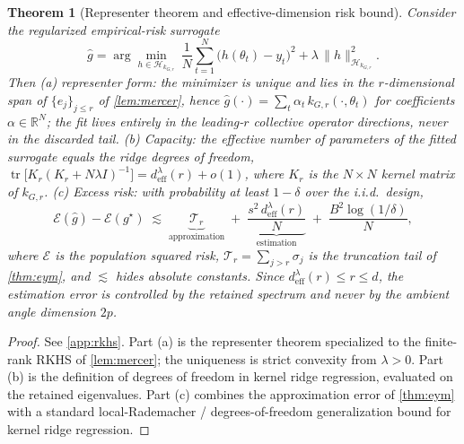 \documentclass[aps,prxquantum,reprint,amsmath,amssymb,floatfix,nofootinbib,superscriptaddress,longbibliography]{revtex4-2}
\newtheorem{theorem}{Theorem}
\theoremstyle{remark}
\newcommand{\bbR}{\mathbb{R}}
\begin{document}
\begin{theorem}[Representer theorem and effective-dimension risk bound]
\label{thm:rkhs}
Consider the regularized empirical-risk surrogate
\begin{equation}
    \widehat g = \arg\min_{h\in\mathcal H_{k_{G,r}}}
    \ \frac1N\sum_{t=1}^{N}\bigl(h(\theta_t)-y_t\bigr)^2
    +\lambda\,\|h\|_{\mathcal H_{k_{G,r}}}^2 .
    \label{eq:erm}
\end{equation}
Then \emph{(a) representer form:} the minimizer is unique and lies in the
\(r\)-dimensional span of \(\{e_j\}_{j\le r}\) of \cref{lem:mercer}, hence
\(\widehat g(\cdot)=\sum_{t}\alpha_t\,k_{G,r}(\cdot,\theta_t)\) for coefficients
\(\alpha\in\bbR^{N}\); the fit lives entirely in the leading-\(r\) collective
operator directions, never in the discarded tail. \emph{(b) Capacity:} the
effective number of parameters of the fitted surrogate equals the ridge degrees of
freedom, \(\operatorname{tr}\!\bigl[K_{r}(K_{r}+N\lambda I)^{-1}\bigr]
= d_{\mathrm{eff}}^{\lambda}(r)+o(1)\), where \(K_r\) is the \(N\times N\) kernel
matrix of \(k_{G,r}\). \emph{(c) Excess risk:} with probability at least
\(1-\delta\) over the i.i.d.\ design,
\begin{equation}
    \mathcal E(\widehat g)-\mathcal E(g^{\star})
    \;\lesssim\;
    \underbrace{\mathcal T_r}_{\text{approximation}}
    \;+\;
    \underbrace{\frac{s^2\,d_{\mathrm{eff}}^{\lambda}(r)}{N}}_{\text{estimation}}
    \;+\;\frac{B^2\log(1/\delta)}{N},
    \label{eq:excessrisk}
\end{equation}
where \(\mathcal E\) is the population squared risk, \(\mathcal T_r=\sum_{j>r}
\sigma_j\) is the truncation tail of \cref{thm:eym}, and \(\lesssim\) hides
absolute constants. Since \(d_{\mathrm{eff}}^{\lambda}(r)\le r\le d\), the
estimation error is controlled by the retained spectrum and never by the ambient
angle dimension \(2p\).
\end{theorem}

\begin{proof}
See \cref{app:rkhs}. Part (a) is the representer theorem specialized to the
finite-rank RKHS of \cref{lem:mercer}; the uniqueness is strict convexity from
\(\lambda>0\). Part (b) is the definition of degrees of freedom in kernel ridge
regression, evaluated on the retained eigenvalues. Part (c) combines the
approximation error of \cref{thm:eym} with a standard local-Rademacher /
degrees-of-freedom generalization bound for kernel ridge regression.
\end{proof}
\end{document}
